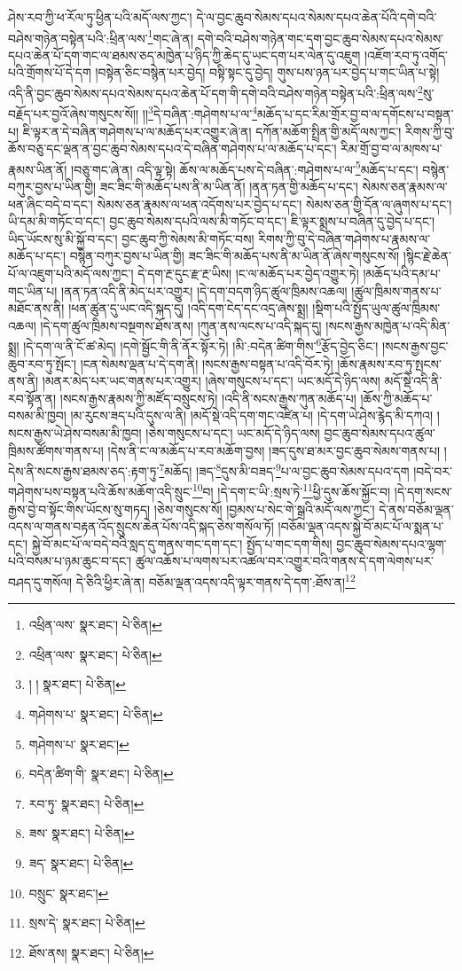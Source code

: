 ཤེས་རབ་ཀྱི་ཕ་རོལ་ཏུ་ཕྱིན་པའི་མདོ་ལས་ཀྱང་། དེ་ལ་བྱང་ཆུབ་སེམས་དཔའ་སེམས་དཔའ་ཆེན་པོའི་དགེ་བའི་བཤེས་གཉེན་བསྟེན་པའི་:ཕྲིན་ལས་\footnote{འཕྲིན་ལས་  སྣར་ཐང་།  པེ་ཅིན། }གང་ཞེ་ན། དགེ་བའི་བཤེས་གཉེན་གང་དག་བྱང་ཆུབ་སེམས་དཔའ་སེམས་དཔའ་ཆེན་པོ་དག་གང་ལ་ཐམས་ཅད་མཁྱེན་པ་ཉིད་ཀྱི་ཆེད་དུ་ཡང་དག་པར་ལེན་དུ་འཇུག །འཇོག་རབ་ཏུ་འགོད་པའི་གྲོགས་པོ་དེ་དག །བསྟེན་ཅིང་བསྙེན་པར་བྱེད། བསྟི་སྟང་དུ་བྱེད། གུས་པས་ཉན་པར་བྱེད་པ་གང་ཡིན་པ་སྟེ། འདི་ནི་བྱང་ཆུབ་སེམས་དཔའ་སེམས་དཔའ་ཆེན་པོ་དག་གི་དགེ་བའི་བཤེས་གཉེན་བསྟེན་པའི་:ཕྲིན་ལས་\footnote{འཕྲིན་ལས་  སྣར་ཐང་།  པེ་ཅིན། }སུ་བརྗོད་པར་བྱའོ་ཞེས་གསུངས་སོ།། །།\footnote{། །  སྣར་ཐང་།  པེ་ཅིན། }དེ་བཞིན་:གཤེགས་པ་ལ་\footnote{གཤེགས་པ་  སྣར་ཐང་།  པེ་ཅིན། }མཆོད་པ་དང་རིམ་གྲོར་བྱ་བ་ལ་དགོངས་པ་བསྟན་པ། ཇི་ལྟར་ན་དེ་བཞིན་གཤེགས་པ་ལ་མཆོད་པར་འགྱུར་ཞེ་ན། དཀོན་མཆོག་སྤྲིན་གྱི་མདོ་ལས་ཀྱང་། རིགས་ཀྱི་བུ་ཆོས་བཅུ་དང་ལྡན་ན་བྱང་ཆུབ་སེམས་དཔའ་དེ་བཞིན་གཤེགས་པ་ལ་མཆོད་པ་དང་། རིམ་གྲོ་བྱ་བ་ལ་མཁས་པ་རྣམས་ཡིན་ནོ། །བཅུ་གང་ཞེ་ན། འདི་ལྟ་སྟེ། ཆོས་ལ་མཆོད་པས་དེ་བཞིན་:གཤེགས་པ་ལ་\footnote{གཤེགས་པ་  སྣར་ཐང་། }མཆོད་པ་དང་། བསྙེན་བཀུར་བྱས་པ་ཡིན་གྱི། ཟང་ཟིང་གི་མཆོད་པས་ནི་མ་ཡིན་ནོ། །ནན་ཏན་གྱི་མཆོད་པ་དང་། སེམས་ཅན་རྣམས་ལ་ཕན་ཞིང་བདེ་བ་དང་། སེམས་ཅན་རྣམས་ལ་ཕན་འདོགས་པར་བྱེད་པ་དང་། སེམས་ཅན་གྱི་དོན་ལ་ཞུགས་པ་དང་། ཡི་དམ་མི་གཏོང་བ་དང་། བྱང་ཆུབ་སེམས་དཔའི་ལས་མི་གཏོང་བ་དང་། ཇི་ལྟར་སྨྲས་པ་བཞིན་དུ་བྱེད་པ་དང་། ཡིད་ཡོངས་སུ་མི་སྐྱོ་བ་དང་། བྱང་ཆུབ་ཀྱི་སེམས་མི་གཏོང་བས། རིགས་ཀྱི་བུ་དེ་བཞིན་གཤེགས་པ་རྣམས་ལ་མཆོད་པ་དང་། བསྙེན་བཀུར་བྱས་པ་ཡིན་གྱི། ཟང་ཟིང་གི་མཆོད་པས་ནི་མ་ཡིན་ནོ་ཞེས་གསུངས་སོ། །སྙིང་རྗེ་ཆེན་པོ་ལ་འཇུག་པའི་མདོ་ལས་ཀྱང་། དེ་དག་རྔ་དུང་རྫ་རྔ་ཡིས། །ང་ལ་མཆོད་པར་བྱེད་འགྱུར་ཏེ། །མཆོད་པའི་དམ་པ་གང་ཡིན་པ། །ནན་ཏན་འདི་ནི་མེད་པར་འགྱུར། །དེ་དག་བདག་ཉིད་ཚུལ་ཁྲིམས་འཆལ། །ཚུལ་ཁྲིམས་གནས་པ་མཐོང་ནས་ནི། །ཕན་ཚུན་དུ་ཡང་འདི་སྐད་དུ། །འདི་དག་ངེད་དང་འདྲ་ཞེས་སྨྲ། །སྡིག་པའི་སྤྱོད་ཡུལ་ཚུལ་ཁྲིམས་འཆལ། །དེ་དག་ཚུལ་ཁྲིམས་བསྔགས་ཐོས་ནས། །ཀུན་ནས་ལངས་པ་འདི་སྐད་དུ། །སངས་རྒྱས་མཁྱེན་པ་འདི་མིན་སྨྲ། །དེ་དག་ལ་ནི་ངོ་ཚ་མེད། །དགེ་སྦྱོང་གི་ནི་ནོར་སྟོར་ཏེ། །མི་:བདེན་ཚིག་གིས་\footnote{བདེན་ཚིག་གི་  སྣར་ཐང་།  པེ་ཅིན། }རྩོད་བྱེད་ཅིང་། །སངས་རྒྱས་བྱང་ཆུབ་རབ་ཏུ་སྤོང་། །ངན་སེམས་ལྡན་པ་དེ་དག་ནི། །སངས་རྒྱས་བསྟན་པ་འདི་བོར་ཏེ། །ཆོས་རྣམས་རབ་ཏུ་སྤངས་ནས་ནི། །མནར་མེད་པར་ཡང་གནས་པར་འགྱུར། །ཞེས་གསུངས་པ་དང་། ཡང་མདོ་དེ་ཉིད་ལས། མདོ་སྡེ་འདི་ནི་རབ་སྟོན་ན། །སངས་རྒྱས་རྣམས་ཀྱི་མཛོད་བསྲུངས་ཏེ། །འདི་ནི་སངས་རྒྱས་ཀུན་མཆོད་པ། །ཆོས་ཀྱི་མཆོད་པ་བསམ་མི་ཁྱབ། །མ་རུངས་ཟད་པའི་དུས་ལ་ནི། །མདོ་སྡེ་འདི་དག་གང་འཛིན་པ། །དེ་དག་ཡེ་ཤེས་རྙེད་མི་དཀའ། །སངས་རྒྱས་ཡེ་ཤེས་བསམ་མི་ཁྱབ། །ཅེས་གསུངས་པ་དང་། ཡང་མདོ་དེ་ཉིད་ལས། བྱང་ཆུབ་སེམས་དཔའ་ཚུལ་ཁྲིམས་ཚོགས་གནས་པ། །དེས་ནི་ང་ལ་མཆོད་པ་རབ་མཆོག་བྱས། །ཟད་དུས་ཐ་མར་བྱང་ཆུབ་སེམས་གནས་པ། །དེས་ནི་སངས་རྒྱས་ཐམས་ཅད་:རྟག་ཏུ་\footnote{རབ་ཏུ་  སྣར་ཐང་།  པེ་ཅིན། }མཆོད། །ཟད་\footnote{ཟས་  སྣར་ཐང་།  པེ་ཅིན། }དུས་མི་བཟད་\footnote{ཟད་  སྣར་ཐང་།  པེ་ཅིན། }པ་ལ་བྱང་ཆུབ་སེམས་དཔའ་དག །བདེ་བར་གཤེགས་པས་བསྟན་པའི་ཆོས་མཆོག་འདི་སྲུང་\footnote{བསྲུང་  སྣར་ཐང་། }བ། །དེ་དག་ང་ཡི་:སྲས་ཏེ་\footnote{སྲས་དེ་  སྣར་ཐང་།  པེ་ཅིན། }ཕྱི་དུས་ཆོས་སྐྱོང་བ། །དེ་དག་སངས་རྒྱས་བྱེ་བ་སྟོང་གིས་ཡོངས་སུ་གཏད། །ཅེས་གསུངས་སོ། །བྱམས་པ་སེང་གེ་སྒྲའི་མདོ་ལས་ཀྱང་། དེ་ནས་བཅོམ་ལྡན་འདས་ལ་གནས་བརྟན་འོད་སྲུངས་ཆེན་པོས་འདི་སྐད་ཅེས་གསོལ་ཏོ། །བཅོམ་ལྡན་འདས་སྐྱེ་བོ་མང་པོ་ལ་སྨན་པ་དང་། སྐྱེ་བོ་མང་པོ་ལ་བདེ་བའི་སླད་དུ་གནས་གང་དག་དང་། སྤྱོད་པ་གང་དག་གིས། བྱང་ཆུབ་སེམས་དཔའ་ལྷག་པའི་བསམ་པ་ཉམ་ཆུང་བ་དང་། ཚུལ་འཆོས་པ་ལགས་པར་འཚལ་བར་འགྱུར་བའི་གནས་དེ་དག་ལེགས་པར་བཤད་དུ་གསོལ། དེ་ཅིའི་ཕྱིར་ཞེ་ན། བཅོམ་ལྡན་འདས་འདི་ལྟར་གནས་དེ་དག་:ཐོས་ན།\footnote{ཐོས་ནས།  སྣར་ཐང་།  པེ་ཅིན། } 